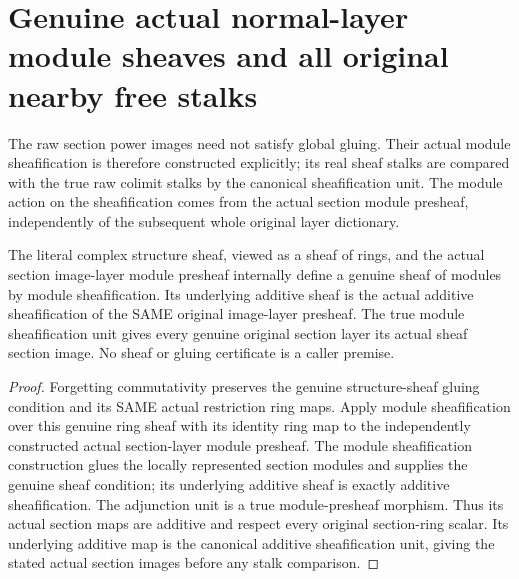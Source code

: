 \section{Genuine actual normal-layer module sheaves and all original nearby free stalks}

The raw section power images need not satisfy global gluing. Their actual
module sheafification is therefore constructed explicitly; its real sheaf
stalks are compared with the true raw colimit stalks by the canonical
sheafification unit. The module action on the sheafification comes from
the actual section module presheaf, independently of the subsequent
whole original layer dictionary.

\begin{definition}
\label{hir:real-domain-actual-normal-layer-module-sheaf}
\leanok
The literal complex structure sheaf, viewed as a sheaf of rings, and the
actual section image-layer module presheaf internally define a genuine
sheaf of modules by module sheafification. Its underlying additive sheaf
is the actual additive sheafification of the SAME original image-layer
presheaf. The true module sheafification unit gives every genuine original
section layer its actual sheaf section image. No sheaf or gluing
certificate is a caller premise.
\end{definition}
\begin{proof}
Forgetting commutativity preserves the genuine structure-sheaf gluing
condition and its SAME actual restriction ring maps. Apply module
sheafification over this genuine ring sheaf with its identity ring map
to the independently constructed actual section-layer module presheaf.
The module sheafification construction glues the locally represented
section modules and supplies the genuine sheaf condition; its underlying
additive sheaf is exactly additive sheafification. The adjunction unit
is a true module-presheaf morphism. Thus its actual section maps are
additive and respect every original section-ring scalar. Its underlying
additive map is the canonical additive sheafification unit, giving the
stated actual section images before any stalk comparison.
\end{proof}


